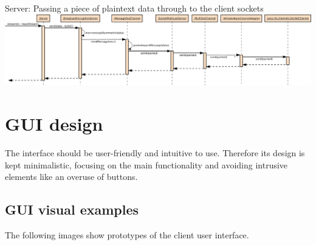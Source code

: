 \documentclass[a4paper,10pt]{scrartcl}
\begin{document}
\begin{landscape}
\begin{illustration}{Server: Passing a piece of plaintext data through to the client sockets}
\includegraphics [width=700px] {figures/sequence_diagram_comm1_server/output.pdf}
\end{illustration}
\end{landscape}

\section{GUI design}
The interface should be user-friendly and intuitive to use. Therefore its design is kept minimalistic, focusing
on the main functionality and avoiding intrusive elements like an overuse of buttons.

\subsection{GUI visual examples}
The following images show prototypes of the client user interface.
\end{document}
